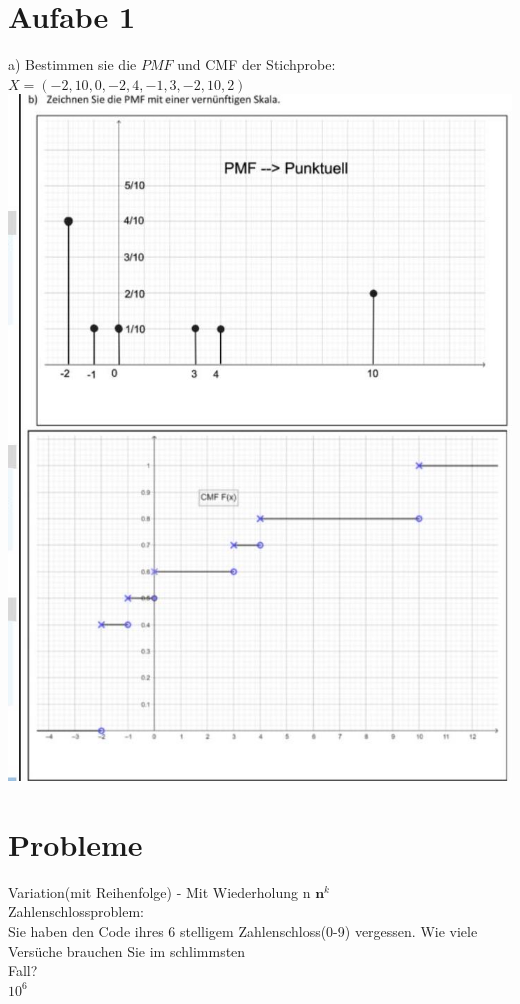 \documentclass[10pt]{article}
\begin{document}
\section*{Aufabe 1}
a) Bestimmen sie die $P M F$ und CMF der Stichprobe: $X=(-2,10,0,-2,4,-1,3,-2,10,2)$\\
\includegraphics[max width=\textwidth, center]{2024_12_29_0906b02acf849bda8665g-2(1)}

\section*{Probleme}
Variation(mit Reihenfolge) - Mit Wiederholung n $\mathbf{n}^{k}$\\
Zahlenschlossproblem:\\
Sie haben den Code ihres 6 stelligem Zahlenschloss(0-9) vergessen. Wie viele Versüche brauchen Sie im schlimmsten\\
Fall?\\
$10^{6}$
\end{document}
